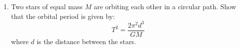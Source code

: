 \documentclass{../../../oss-apphys}
\begin{document}
\begin{enumerate}[leftmargin=15pt]
\item Two stars of equal mass $M$ are orbiting each other in a circular path.
  Show that the orbital period is given by:
  \begin{displaymath}
    T^2=\frac{2\pi^2d^3}{GM}
  \end{displaymath}
  where $d$ is the distance between the stars.
  


\end{enumerate}
\end{document}
